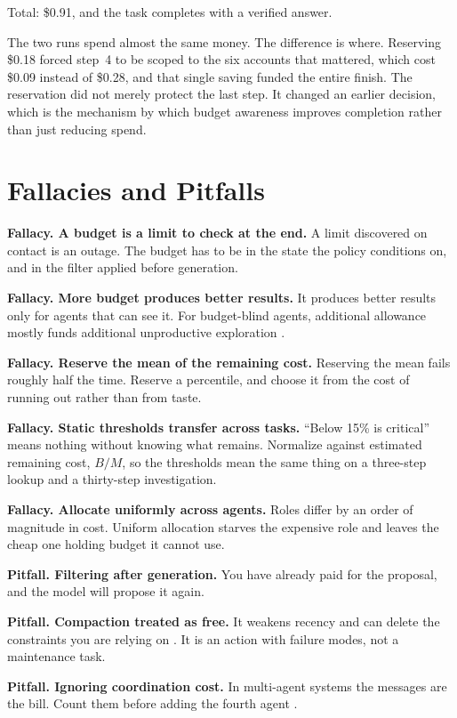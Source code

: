 Total: \$0.91, and the task completes with a verified answer.

The two runs spend almost the same money. The difference is where. Reserving
\$0.18 forced step~4 to be scoped to the six accounts that mattered, which cost
\$0.09 instead of \$0.28, and that single saving funded the entire finish. The
reservation did not merely protect the last step. It changed an earlier
decision, which is the mechanism by which budget awareness improves completion
rather than just reducing spend.

\section{Fallacies and Pitfalls}

\textbf{Fallacy. A budget is a limit to check at the end.} A limit discovered on
contact is an outage. The budget has to be in the state the policy conditions on,
and in the filter applied before generation.

\textbf{Fallacy. More budget produces better results.} It produces better results
only for agents that can see it. For budget-blind agents, additional allowance
mostly funds additional unproductive exploration \cite{bats2025, budgettooluse2026}.

\textbf{Fallacy. Reserve the mean of the remaining cost.} Reserving the mean fails
roughly half the time. Reserve a percentile, and choose it from the cost of
running out rather than from taste.

\textbf{Fallacy. Static thresholds transfer across tasks.} ``Below 15\% is
critical'' means nothing without knowing what remains. Normalize against
estimated remaining cost, $B/M$, so the thresholds mean the same thing on a
three-step lookup and a thirty-step investigation.

\textbf{Fallacy. Allocate uniformly across agents.} Roles differ by an order of
magnitude in cost. Uniform allocation starves the expensive role and leaves the
cheap one holding budget it cannot use.

\textbf{Pitfall. Filtering after generation.} You have already paid for the
proposal, and the model will propose it again.

\textbf{Pitfall. Compaction treated as free.} It weakens recency
\cite{compressreliab2026} and can delete the constraints you are relying on
\cite{govdecay2026}. It is an action with failure modes, not a maintenance task.

\textbf{Pitfall. Ignoring coordination cost.} In multi-agent systems the messages
are the bill. Count them before adding the fourth agent \cite{cohesion2026}.

